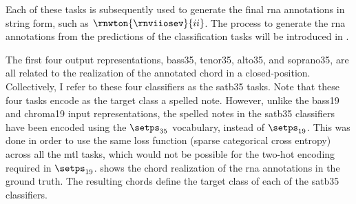 Each of these tasks is subsequently used to generate the
final \gls{rna} annotations in string form, such as
$\rnwton{\rnviiosev}{ii}$. The process to generate the
\gls{rna} annotations from the predictions of the
classification tasks will be introduced in
. 

The first four output representations, \gls{bass35},
\gls{tenor35}, \gls{alto35}, and \gls{soprano35}, are all
related to the realization of the annotated chord in a
\gls{closed-position}. Collectively, I refer to these four
classifiers as the \gls{satb35} tasks. Note that these four
tasks encode as the target class a spelled note. However,
unlike the \gls{bass19} and \gls{chroma19} input
representations, the spelled notes in the \gls{satb35}
classifiers have been encoded using the $\setps_{35}$
vocabulary, instead of $\setps_{19}$. This was done in order
to use the same loss function (sparse categorical cross
entropy) across all the \gls{mtl} tasks, which would not be
possible for the two-hot encoding required in $\setps_{19}$.
 shows the chord realization of the
\gls{rna} annotations in the ground truth. The resulting
chords define the target class of each of the \gls{satb35}
classifiers.


